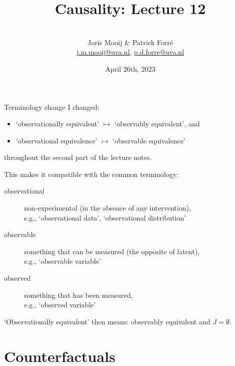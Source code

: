 \title[Causality]{Causality: Lecture 12}
\author[Joris Mooij]{\\[5mm]\large Joris Mooij \& Patrick Forr\'e\\
\url{j.m.mooij@uva.nl}, \url{p.d.forre@uva.nl}}
\date[2022-04-26]{\normalsize April 26th, 2023}
\maketitle

\begin{frame}{Terminology change}
  I changed:
  \begin{itemize}
    \item `observationally equivalent' $\mapsto$ `observably equivalent', and
    \item `observational equivalence' $\mapsto$ `observable equivalence'
  \end{itemize}
  throughout the second part of the lecture notes.

  \bigskip
  This makes it compatible with the common terminology:
  \begin{description}
    \item[observational] non-experimental (in the absence of any intervention),\\
      e.g., `observational data', `observational distribution'
    \item[observable] something that can be measured (the opposite of latent),\\
      e.g., `observable variable'
    \item[observed] something that has been measured,\\
      e.g., `observed variable'
  \end{description}

  \bigskip
  `Observationally equivalent' then means: observably equivalent and $J = \emptyset$.
\end{frame}

\part{Counterfactuals}
\frame{\partpage}

